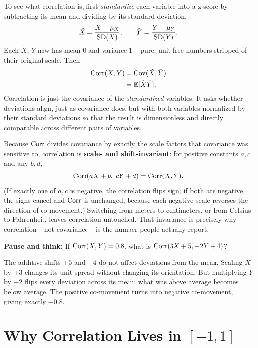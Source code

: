 \begin{intuitionbox}
To see what correlation is, first \emph{standardize} each variable
into a z-score by subtracting its mean and dividing by its standard deviation,
\[
\tilde X = \frac{X - \mu_X}{\operatorname{SD}(X)}, \qquad
\tilde Y = \frac{Y - \mu_Y}{\operatorname{SD}(Y)}.
\]
Each $\tilde X$, $\tilde Y$ now has mean $0$ and variance $1$ -- pure, unit-free
numbers stripped of their original scale. Then
\begin{align*}
\operatorname{Corr}(X, Y) &= \operatorname{Cov}(\tilde X, \tilde Y) \\
&= \operatorname{\mathbb{E}}[\tilde X \tilde Y].
\end{align*}
Correlation is just the covariance of the \emph{standardized} variables. It asks
whether deviations align, just as covariance does, but with both variables normalized
by their standard deviations so that the result is dimensionless and directly comparable
across different pairs of variables.
\end{intuitionbox}

Because $\operatorname{Corr}$ divides covariance by exactly the scale factors that covariance was
sensitive to, correlation is \textbf{scale- and shift-invariant}: for positive
constants $a, c$ and any $b, d$,
\[
\operatorname{Corr}(aX + b,\; cY + d) = \operatorname{Corr}(X, Y).
\]
(If exactly one of $a, c$ is negative, the correlation flips sign; if both are negative, the signs cancel and $\operatorname{Corr}$ is unchanged, because each negative scale
reverses the direction of co-movement.) Switching from meters to centimeters, or
from Celsius to Fahrenheit, leaves correlation untouched. That invariance is
precisely why correlation -- not covariance -- is the number people actually report.

\begin{recoverybox}
\textbf{Pause and think:} If $\operatorname{Corr}(X, Y) = 0.8$, what is $\operatorname{Corr}(3X + 5, -2Y + 4)$?

The additive shifts $+5$ and $+4$ do not affect deviations from the mean. Scaling $X$ by $+3$ changes its unit spread without changing its orientation. But multiplying $Y$ by $-2$ flips every deviation across its mean: what was above average becomes below average. The positive co-movement turns into negative co-movement, giving exactly $-0.8$.
\end{recoverybox}

\section{Why Correlation Lives in $[-1, 1]$}
\label{ch14:bounds}

